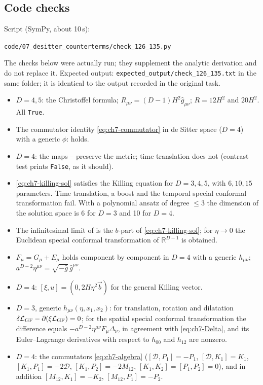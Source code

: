 \subsection{Code checks}
\tC{}
Script (SymPy, about 10\,s):
\begin{center}\texttt{code/07\_desitter\_counterterms/check\_126\_135.py}\end{center}
The checks below were actually run; they supplement the analytic derivation and do not replace it.
Expected output: \texttt{expected\_output/}\allowbreak\texttt{check\_126\_135.txt} in the same folder; it is identical to the output recorded in the original task.
\begin{itemize}[leftmargin=26pt]
\item[(A)] $D=4,5$: the Christoffel formula; $R_{\mu\nu}=(D-1)H^2\hat g_{\mu\nu}$; $R=12H^2$ and $20H^2$. All \texttt{True}.
\item[(B)] The commutator identity \eqref{eq:ch7-commutator} in de Sitter space ($D=4$) with a generic $\phi$: holds.
\item[(C)] $D=4$: the maps -- preserve the metric; time translation does not (contrast test prints \texttt{False}, as it should).
\item[(D)] \eqref{eq:ch7-killing-sol} satisfies the Killing equation for $D=3,4,5$, with $6,10,15$ parameters.
Time translation, a boost and the temporal special conformal transformation fail.
With a polynomial ansatz of degree $\le3$ the dimension of the solution space is 6 for $D=3$ and 10 for $D=4$.
\item[(E)] The infinitesimal limit of  is the $b$-part of \eqref{eq:ch7-killing-sol}; for $\eta\to0$ the Euclidean special conformal transformation of $\mathbb R^{D-1}$ is obtained.
\item[(F)] $F_\mu=G_\mu+E_\mu$ holds component by component in $D=4$ with a generic $h_{\mu\nu}$; $a^{D-2}\eta^{\mu\nu}=\sqrt{-\hat g}\,\hat g^{\mu\nu}$.
\item[(G)] $D=4$: $[\xi,u]=(0,2H\eta^2\vec b)$ for the general Killing vector.
\item[(H)] $D=3$, generic $h_{\mu\nu}(\eta,x_1,x_2)$:
for translation, rotation and dilatation $\delta\mathcal{L}_{\mathrm{GF}}-\partial(\xi\mathcal{L}_{\mathrm{GF}})=0$;
for the spatial special conformal transformation the difference equals $-a^{D-2}\eta^{\mu\nu}F_\mu\Delta_\nu$, in agreement with \eqref{eq:ch7-Delta}, and its Euler--Lagrange derivatives with respect to $h_{00}$ and $h_{12}$ are nonzero.
\item[(I)] $D=4$: the commutators \eqref{eq:ch7-algebra} ($[\mathcal D,P_1]=-P_1$, $[\mathcal D,K_1]=K_1$, $[K_1,P_1]=-2\mathcal D$, $[K_1,P_2]=-2M_{12}$, $[K_1,K_2]=[P_1,P_2]=0$), and in addition $[M_{12},K_1]=-K_2$, $[M_{12},P_1]=-P_2$.
\end{itemize}

